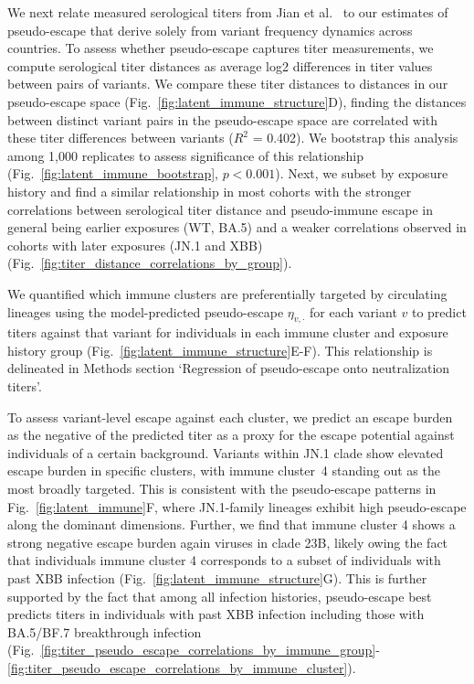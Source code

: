 \documentclass[11pt,oneside,letterpaper]{article}
\begin{document}
We next relate measured serological titers from Jian et al.\ \cite{Jian2023} to our estimates of pseudo-escape that derive solely from variant frequency dynamics across countries.
To assess whether pseudo-escape captures titer measurements, we compute serological titer distances as average log2 differences in titer values between pairs of variants.
We compare these titer distances to distances in our pseudo-escape space (Fig.~\ref{fig:latent_immune_structure}D), finding the distances between distinct variant pairs in the pseudo-escape space are correlated with these titer differences between variants ($R^2$ = 0.402).
We bootstrap this analysis among 1,000 replicates to assess significance of this relationship (Fig.~\ref{fig:latent_immune_bootstrap}, $p < 0.001$).
Next, we subset by exposure history and find a similar relationship in most cohorts with the stronger correlations between serological titer distance and pseudo-immune escape in general being earlier exposures (WT, BA.5) and a weaker correlations observed in cohorts with later exposures (JN.1 and XBB) (Fig.~\ref{fig:titer_distance_correlations_by_group}).

We quantified which immune clusters are preferentially targeted by circulating lineages using the model-predicted pseudo-escape $\eta_{v,\cdot}$ for each variant $v$ to predict titers against that variant for individuals in each immune cluster and exposure history group (Fig.~\ref{fig:latent_immune_structure}E-F).
This relationship is delineated in Methods section `Regression of pseudo-escape onto neutralization titers'.

To assess variant-level escape against each cluster, we predict an escape burden as the negative of the predicted titer as a proxy for the escape potential against individuals of a certain background.
Variants within JN.1 clade show elevated escape burden in specific clusters, with immune cluster~4 standing out as the most broadly targeted.
This is consistent with the pseudo-escape patterns in Fig.~\ref{fig:latent_immune}F, where JN.1-family lineages exhibit high pseudo-escape along the dominant dimensions.
Further, we find that immune cluster 4 shows a strong negative escape burden again viruses in clade 23B, likely owing the fact that individuals immune cluster 4 corresponds to a subset of individuals with past XBB infection (Fig.~\ref{fig:latent_immune_structure}G).
This is further supported by the fact that among all infection histories, pseudo-escape best predicts titers in individuals with past XBB infection including those with BA.5/BF.7 breakthrough infection (Fig.~\ref{fig:titer_pseudo_escape_correlations_by_immune_group}-\ref{fig:titer_pseudo_escape_correlations_by_immune_cluster}).
\end{document}
